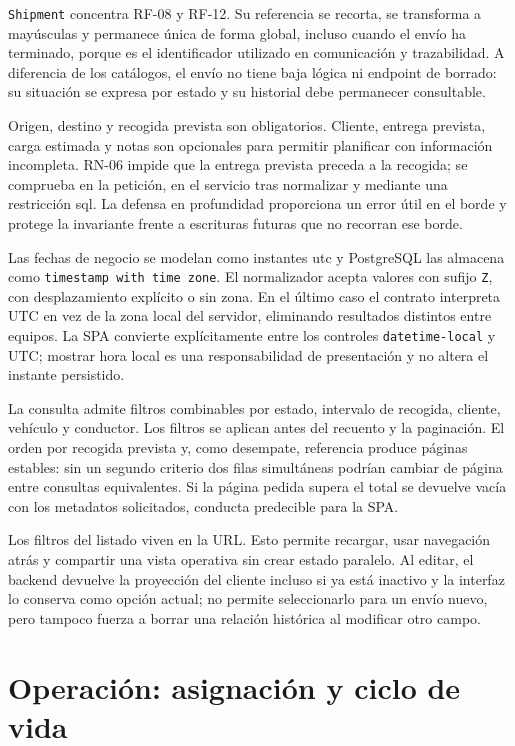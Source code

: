\texttt{Shipment} concentra RF-08 y RF-12. Su referencia se recorta, se transforma a mayúsculas y permanece única de forma global, incluso cuando el envío ha terminado, porque es el identificador utilizado en comunicación y trazabilidad. A diferencia de los catálogos, el envío no tiene baja lógica ni endpoint de borrado: su situación se expresa por estado y su historial debe permanecer consultable.

Origen, destino y recogida prevista son obligatorios. Cliente, entrega prevista, carga estimada y notas son opcionales para permitir planificar con información incompleta. RN-06 impide que la entrega prevista preceda a la recogida; se comprueba en la petición, en el servicio tras normalizar y mediante una restricción \gls{sql}. La defensa en profundidad proporciona un error útil en el borde y protege la invariante frente a escrituras futuras que no recorran ese borde.

Las fechas de negocio se modelan como instantes \gls{utc} y PostgreSQL las almacena como \texttt{timestamp with time zone}. El normalizador acepta valores con sufijo \texttt{Z}, con desplazamiento explícito o sin zona. En el último caso el contrato interpreta UTC en vez de la zona local del servidor, eliminando resultados distintos entre equipos. La SPA convierte explícitamente entre los controles \texttt{datetime-local} y UTC; mostrar hora local es una responsabilidad de presentación y no altera el instante persistido.

La consulta admite filtros combinables por estado, intervalo de recogida, cliente, vehículo y conductor. Los filtros se aplican antes del recuento y la paginación. El orden por recogida prevista y, como desempate, referencia produce páginas estables: sin un segundo criterio dos filas simultáneas podrían cambiar de página entre consultas equivalentes. Si la página pedida supera el total se devuelve vacía con los metadatos solicitados, conducta predecible para la SPA.

Los filtros del listado viven en la URL. Esto permite recargar, usar navegación atrás y compartir una vista operativa sin crear estado paralelo. Al editar, el backend devuelve la proyección del cliente incluso si ya está inactivo y la interfaz lo conserva como opción actual; no permite seleccionarlo para un envío nuevo, pero tampoco fuerza a borrar una relación histórica al modificar otro campo.

\section{Operación: asignación y ciclo de vida}

